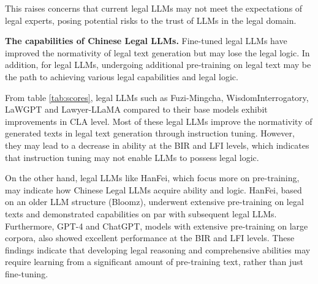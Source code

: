 This raises concerns that current legal LLMs may not meet the expectations of legal experts, posing potential risks to the trust of LLMs in the legal domain.

\textbf{ The capabilities of Chinese Legal LLMs.} Fine-tuned legal LLMs have improved the normativity of legal text generation but may lose the legal logic. 
In addition, for legal LLMs, undergoing additional pre-training on legal text may be the path to achieving various legal capabilities and legal logic.

From table \ref{tab:scores}, legal LLMs such as Fuzi-Mingcha, WisdomInterrogatory, LaWGPT and Lawyer-LLaMA compared to their base models exhibit improvements in CLA level. 
Most of these legal LLMs improve the normativity of generated texts in legal text generation through instruction tuning. However, they may lead to a decrease in ability at the BIR and LFI levels, which indicates that instruction tuning may not enable LLMs to possess legal logic.

On the other hand, legal LLMs like HanFei, which focus more on pre-training, may indicate how Chinese Legal LLMs acquire ability and logic.
HanFei, based on an older LLM structure (Bloomz), underwent extensive pre-training on legal texts and demonstrated capabilities on par with subsequent legal LLMs.
Furthermore, GPT-4 and ChatGPT, models with extensive pre-training on large corpora, also showed excellent performance at the BIR and LFI levels. 
These findings indicate that developing legal reasoning and comprehensive abilities may require learning from a significant amount of pre-training text, rather than just fine-tuning. 

    
        

